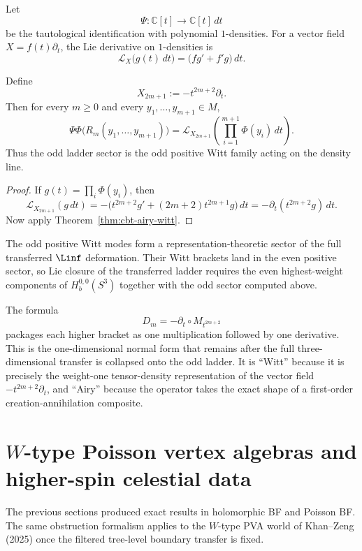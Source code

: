 Let
\[
\Psi:\mathbb{C}[t]\to \mathbb{C}[t]\,dt
\]
be the tautological identification with polynomial $1$-densities. For a vector field $X=f(t)\partial_t$, the Lie derivative on $1$-densities is
\[
\mathcal L_X\bigl(g(t)\,dt\bigr)
=
\bigl(fg'+f'g\bigr)\,dt.
\]

\begin{corollary}
Define
\[
X_{2m+1}:=-t^{2m+2}\partial_t.
\]
Then for every $m\ge0$ and every $y_1,\dots,y_{m+1}\in M$,
\[
\Psi\Phi\bigl(R_m(y_1,\dots,y_{m+1})\bigr)
=
\mathcal L_{X_{2m+1}}
\left(
\prod_{i=1}^{m+1}\Phi(y_i)\,dt
\right).
\]
Thus the odd ladder sector is the odd positive Witt family acting on the density line.
\end{corollary}

\begin{proof}
If $g(t)=\prod_i\Phi(y_i)$, then
\[
\mathcal L_{X_{2m+1}}(g\,dt)
=
-\bigl(t^{2m+2}g'+(2m+2)t^{2m+1}g\bigr)\,dt
=
-\partial_t(t^{2m+2}g)\,dt.
\]
Now apply Theorem~\ref{thm:cbt-airy-witt}.
\end{proof}

\begin{remark}
The odd positive Witt modes form a representation-theoretic sector of
the full transferred $\Linf$ deformation. Their Witt brackets land in
the even positive sector, so Lie closure of the transferred ladder
requires the even highest-weight components of $H_b^{0,0}(S^3)$
together with the odd sector computed above.
\end{remark}

\begin{remark}
The formula
\[
D_m=-\partial_t\circ M_{t^{2m+2}}
\]
packages each higher bracket as one multiplication followed by one derivative. This is the one-dimensional normal form that remains after the full three-dimensional transfer is collapsed onto the odd ladder. It is ``Witt'' because it is precisely the weight-one tensor-density representation of the vector field $-t^{2m+2}\partial_t$, and ``Airy'' because the operator takes the exact shape of a first-order creation-annihilation composite.
\end{remark}

\section{$W$-type Poisson vertex algebras and higher-spin celestial data}

The previous sections produced exact results in holomorphic BF and
Poisson BF. The same obstruction formalism applies to the $W$-type
PVA world of Khan--Zeng (2025) once the filtered tree-level boundary
transfer is fixed.

